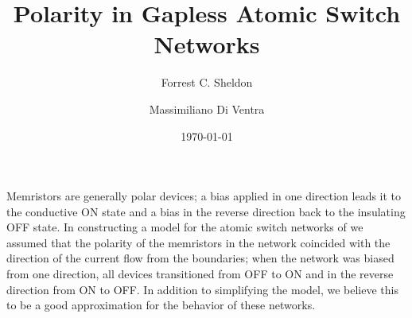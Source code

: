 \documentclass[aps,prl,preprint,groupedaddress]{revtex4-1}
\begin{document}

\title{Polarity in Gapless Atomic Switch Networks}

\author{Forrest C. Sheldon}


\author{Massimiliano Di Ventra}


\date{\today}

\pacs{}

\maketitle

Memristors are generally polar devices; a bias applied in one direction
leads it to the conductive ON
state and a bias in the reverse direction back to the insulating OFF
state.  In constructing a model for
the atomic switch networks of \cite{Avizienis2012, Stieg2014, Stieg14}
we assumed that the polarity of the memristors in the network coincided
with the direction of the current flow from the boundaries; when the
network was biased from one direction, all devices transitioned from
OFF to ON and in the reverse direction from ON to OFF. In addition to
simplifying the model, we believe this to be a good approximation for
the behavior of these networks.
\end{document}
